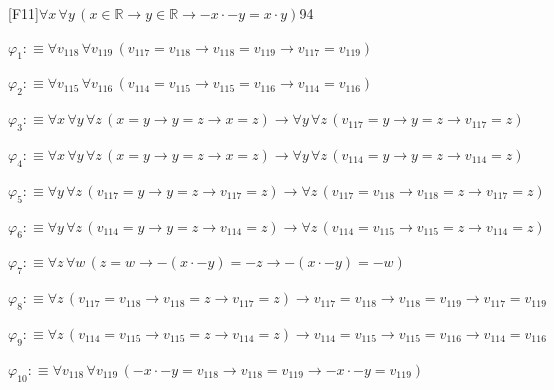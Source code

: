 \begin{fullproof}{[F11]}{$\forall x\,\forall y\,(x \in \mathbb{R} \to y \in \mathbb{R} \to -x \cdot -y = x \cdot y)$}{94}
\begin{ptree}
\noLine
{}
\noLine
{}
\end{ptree}
\begin{abbrevlist}
\item $\varphi_{1} :\equiv \forall v_{118}\,\forall v_{119}\,(v_{117} = v_{118} \to v_{118} = v_{119} \to v_{117} = v_{119})$
\item $\varphi_{2} :\equiv \forall v_{115}\,\forall v_{116}\,(v_{114} = v_{115} \to v_{115} = v_{116} \to v_{114} = v_{116})$
\item $\varphi_{3} :\equiv \forall x\,\forall y\,\forall z\,(x = y \to y = z \to x = z) \to \forall y\,\forall z\,(v_{117} = y \to y = z \to v_{117} = z)$
\item $\varphi_{4} :\equiv \forall x\,\forall y\,\forall z\,(x = y \to y = z \to x = z) \to \forall y\,\forall z\,(v_{114} = y \to y = z \to v_{114} = z)$
\item $\varphi_{5} :\equiv \forall y\,\forall z\,(v_{117} = y \to y = z \to v_{117} = z) \to \forall z\,(v_{117} = v_{118} \to v_{118} = z \to v_{117} = z)$
\item $\varphi_{6} :\equiv \forall y\,\forall z\,(v_{114} = y \to y = z \to v_{114} = z) \to \forall z\,(v_{114} = v_{115} \to v_{115} = z \to v_{114} = z)$
\item $\varphi_{7} :\equiv \forall z\,\forall w\,(z = w \to -(x \cdot -y) = -z \to -(x \cdot -y) = -w)$
\item $\varphi_{8} :\equiv \forall z\,(v_{117} = v_{118} \to v_{118} = z \to v_{117} = z) \to v_{117} = v_{118} \to v_{118} = v_{119} \to v_{117} = v_{119}$
\item $\varphi_{9} :\equiv \forall z\,(v_{114} = v_{115} \to v_{115} = z \to v_{114} = z) \to v_{114} = v_{115} \to v_{115} = v_{116} \to v_{114} = v_{116}$
\item $\varphi_{10} :\equiv \forall v_{118}\,\forall v_{119}\,(-x \cdot -y = v_{118} \to v_{118} = v_{119} \to -x \cdot -y = v_{119})$

\end{abbrevlist}
\end{fullproof}
